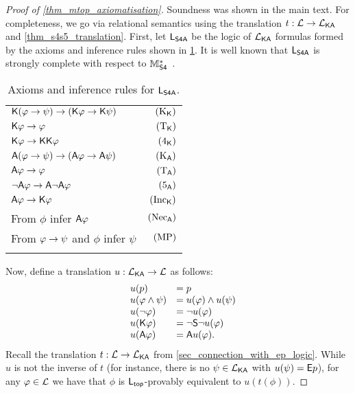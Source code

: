 \begin{proof}[Proof of \cref{thm_mtop_axiomatisation}]

Soundness was shown in the main text. For completeness, we go via relational
semantics using the translation $t: \mathcal{L} \to \mathcal{L}_{\mathsf{K}\mathsf{A}}$ and
\cref{thm_s4s5_translation}. First, let $\mathsf{L}_{\mathsf{S4A}}$ be the logic of $\mathcal{L}_{\mathsf{K}\mathsf{A}}$
formulas formed by the axioms and inference rules shown in
\cref{tab_axioms_sfoura}. It is well known that $\mathsf{L}_{\mathsf{S4A}}$ is strongly
complete with respect to $\mathbb{M}^*_{\mathsf{S4}}$~\citep[Theorem 7.2]{blackburn2002modal}.

\begin{table}[h]
    \begin{center}
        \begin{minipage}{174pt}
            \caption{Axioms and inference rules for $\mathsf{L}_{\mathsf{S4A}}$.}
            \label{tab_axioms_sfoura}
            \begin{tabular}{lr}
                \toprule
               $\mathsf{K}(\varphi \to \psi) \to (\mathsf{K}\varphi \to \mathsf{K}\psi)$
                   & $(\text{K}_{\mathsf{K}})$ \\
               $\mathsf{K}\varphi \to \varphi$
                   & $(\text{T}_{\mathsf{K}})$ \\
               $\mathsf{K}\varphi \to \mathsf{K}\mathsf{K}\varphi$
                   & $(\text{4}_{\mathsf{K}})$ \\
               \midrule
               $\mathsf{A}(\varphi \to \psi) \to (\mathsf{A}\varphi \to \mathsf{A}\psi)$
                   & $(\text{K}_{\mathsf{A}})$ \\
               $\mathsf{A}\varphi \to \varphi$
                   & $(\text{T}_{\mathsf{A}})$ \\
               $\neg\mathsf{A}\varphi \to \mathsf{A}\neg\mathsf{A}\varphi$
                   & $(\text{5}_{\mathsf{A}})$ \\
               \midrule
               $\mathsf{A}\varphi \to \mathsf{K}\varphi$
                   & $(\text{Inc}_{\mathsf{K}})$ \\
               \midrule
               From $\phi$ infer $\mathsf{A}\varphi$
                   & $(\text{Nec}_{\mathsf{A}})$ \\
               From $\varphi \to \psi$ and $\phi$ infer $\psi$
                   & $(\text{MP})$ \\
                \botrule
            \end{tabular}
        \end{minipage}
    \end{center}
\end{table}

Now, define a translation $u: \mathcal{L}_{\mathsf{K}\mathsf{A}} \to \mathcal{L}$ as follows:
\[
\begin{array}{lll}
 &u(p) &= p \\
 &u(\varphi \land \psi) &= u(\varphi) \land u(\psi) \\
 &u(\neg\varphi) &= \neg u(\varphi) \\
 &u(\mathsf{K}\varphi) &= \neg\mathsf{S}\neg u(\varphi) \\
 &u(\mathsf{A}\varphi) &= \mathsf{A} u(\varphi).
\end{array}\]
Recall the translation $t: \mathcal{L} \to \mathcal{L}_{\mathsf{K}\mathsf{A}}$ from
\cref{sec_connection_with_ep_logic}. While $u$ is not the inverse of $t$ (for
instance, there is no $\psi \in \mathcal{L}_{\mathsf{K}\mathsf{A}}$ with $u(\psi) = \mathsf{E} p$), for any $\varphi
\in \mathcal{L}$ we have that $\phi$ is $\mathsf{L}_{\mathsf{top}}$-provably equivalent to $u(t(\phi))$.


\end{proof}
